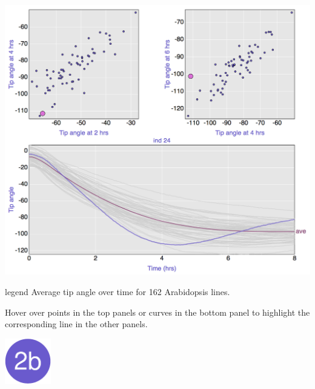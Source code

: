 \documentclass[final,plain]{beamer}
\newlength{\onecolwid}
\newcommand{\colfivevsep}{\vspace{23mm}}
\begin{document}
\begin{frame}[t]
\begin{columns}[t]
\begin{column}{\onecolwid}
    \centerline{\href{http://www.biostat.wisc.edu/~kbroman/posters/ENAR2014/2a}{\includegraphics[width=\onecolwid]{Figs/2a.png}}}

      \vspace{10mm} %

        \begin{beamercolorbox}[sep=1em, wd=\onecolwid]{legend} \rmfamily
           Average tip angle over time for 162 Arabidopsis
           lines.

           \vspace{12pt}

          Hover over points in the top panels or curves in the bottom
          panel to highlight the corresponding line in the other
          panels.
        \end{beamercolorbox}


  \colfivevsep %

    \href{http://www.biostat.wisc.edu/~kbroman/posters/ENAR2014/2b}{\includegraphics[width=2cm]{Figs/dot2b.pdf}}


\end{column}
\end{columns}
\end{frame}
\end{document}

